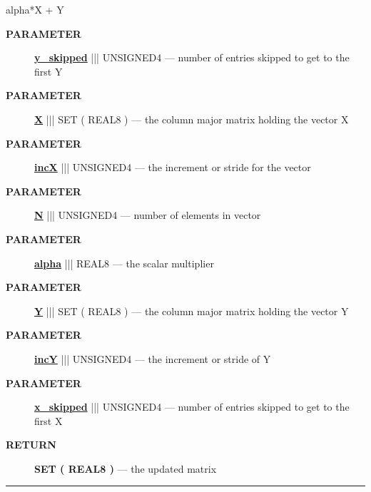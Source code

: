 \par





alpha*X + Y






\par
\begin{description}
\item [\colorbox{tagtype}{\color{white} \textbf{\textsf{PARAMETER}}}] \textbf{\underline{y\_skipped}} ||| UNSIGNED4 --- number of entries skipped to get to the first Y
\item [\colorbox{tagtype}{\color{white} \textbf{\textsf{PARAMETER}}}] \textbf{\underline{X}} ||| SET ( REAL8 ) --- the column major matrix holding the vector X
\item [\colorbox{tagtype}{\color{white} \textbf{\textsf{PARAMETER}}}] \textbf{\underline{incX}} ||| UNSIGNED4 --- the increment or stride for the vector
\item [\colorbox{tagtype}{\color{white} \textbf{\textsf{PARAMETER}}}] \textbf{\underline{N}} ||| UNSIGNED4 --- number of elements in vector
\item [\colorbox{tagtype}{\color{white} \textbf{\textsf{PARAMETER}}}] \textbf{\underline{alpha}} ||| REAL8 --- the scalar multiplier
\item [\colorbox{tagtype}{\color{white} \textbf{\textsf{PARAMETER}}}] \textbf{\underline{Y}} ||| SET ( REAL8 ) --- the column major matrix holding the vector Y
\item [\colorbox{tagtype}{\color{white} \textbf{\textsf{PARAMETER}}}] \textbf{\underline{incY}} ||| UNSIGNED4 --- the increment or stride of Y
\item [\colorbox{tagtype}{\color{white} \textbf{\textsf{PARAMETER}}}] \textbf{\underline{x\_skipped}} ||| UNSIGNED4 --- number of entries skipped to get to the first X
\end{description}







\par
\begin{description}
\item [\colorbox{tagtype}{\color{white} \textbf{\textsf{RETURN}}}] \textbf{SET ( REAL8 )} --- the updated matrix
\end{description}




\rule{\linewidth}{0.5pt}
